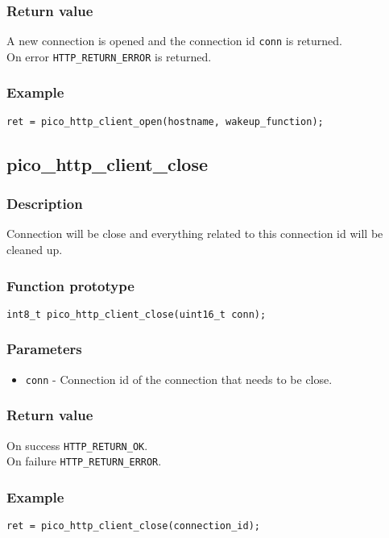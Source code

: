 \subsubsection*{Return value}
A new connection is opened and the connection id \texttt{conn} is returned.
\\On error \texttt{HTTP\_RETURN\_ERROR} is returned.

\subsubsection*{Example}
\begin{verbatim}
ret = pico_http_client_open(hostname, wakeup_function);
\end{verbatim}


\subsection{pico\_http\_client\_close}

\subsubsection*{Description}
Connection will be close and everything related to this connection id will be cleaned up.

\subsubsection*{Function prototype}
\texttt{int8\_t pico\_http\_client\_close(uint16\_t conn);}

\subsubsection*{Parameters}
\begin{itemize}[noitemsep]
\item \texttt{conn} - Connection id of the connection that needs to be close.
\end{itemize}
\subsubsection*{Return value}
On success \texttt{HTTP\_RETURN\_OK}.
\\On failure \texttt{HTTP\_RETURN\_ERROR}.
\subsubsection*{Example}
\begin{verbatim}
ret = pico_http_client_close(connection_id);
\end{verbatim}

